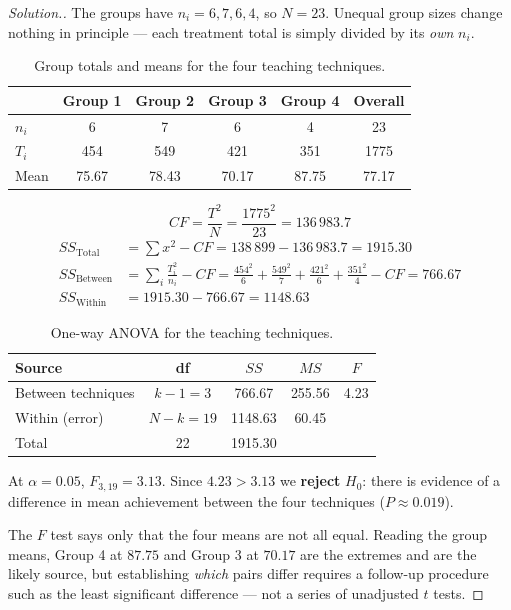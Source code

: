 \documentclass[11pt,a4paper]{article}
\theoremstyle{definition}
\newenvironment{solution}
  {\renewcommand{\qedsymbol}{}\begin{proof}[\textit{Solution}.]}
  {\end{proof}}
\begin{document}
\begin{solution}
The groups have $n_i=6, 7, 6, 4$, so $N=23$. Unequal group sizes change nothing in principle
--- each treatment total is simply divided by its \emph{own} $n_i$.
\begin{table}[H]
\centering
\begin{tabular}{|l|c|c|c|c|c|}
\hline
 & Group 1 & Group 2 & Group 3 & Group 4 & Overall\\
\hline
$n_i$ & 6 & 7 & 6 & 4 & 23\\
$T_i$ & 454 & 549 & 421 & 351 & 1775\\
Mean & 75.67 & 78.43 & 70.17 & 87.75 & 77.17\\
\hline
\end{tabular}
\caption{Group totals and means for the four teaching techniques.}
\end{table}

\[CF=\frac{T^2}{N}=\frac{1775^2}{23}=136\,983.7\]
\begin{align*}
SS_{\text{Total}} &=\sum x^2-CF=138\,899-136\,983.7=1915.30\\
SS_{\text{Between}} &=\sum_i\frac{T_i^2}{n_i}-CF
=\frac{454^2}{6}+\frac{549^2}{7}+\frac{421^2}{6}+\frac{351^2}{4}-CF=766.67\\
SS_{\text{Within}} &=1915.30-766.67=1148.63
\end{align*}

\begin{table}[H]
\centering
\begin{tabular}{|l|c|c|c|c|}
\hline
Source & df & $SS$ & $MS$ & $F$\\
\hline
Between techniques & $k-1=3$ & 766.67 & 255.56 & 4.23\\
Within (error) & $N-k=19$ & 1148.63 & 60.45 & \\
\hline
Total & 22 & 1915.30 & & \\
\hline
\end{tabular}
\caption{One-way ANOVA for the teaching techniques.}
\end{table}

At $\alpha=0.05$, $F_{3,19}=3.13$. Since $4.23>3.13$ we \textbf{reject} $H_0$: there is
evidence of a difference in mean achievement between the four techniques ($P\approx 0.019$).

The $F$ test says only that the four means are not all equal. Reading the group means, Group
4 at $87.75$ and Group 3 at $70.17$ are the extremes and are the likely source, but
establishing \emph{which} pairs differ requires a follow-up procedure such as the least
significant difference --- not a series of unadjusted $t$ tests.
\end{solution}
\end{document}
